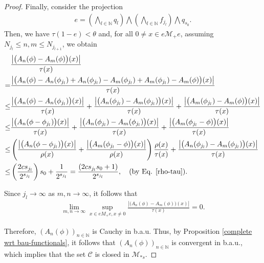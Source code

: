 \documentclass[11pt]{amsart}
\theoremstyle{definition}
\theoremstyle{myremark}
\numberwithin{equation}{section}
\begin{document}
\begin{proof}
		\noindent Finally, consider the projection  
		\begin{align*}
			e= \left( \underset{l \in \mathbb{N}}{\bigwedge} q_l \right) \bigwedge \left( \underset{l \in \mathbb{N}}{\bigwedge} f_{j_l} \right) \bigwedge q_{s_0}.
		\end{align*}
		Then, we have $\tau(1 - e) < \theta$ and, for all $0 \neq x \in e \mathcal{M}_+ e$, assuming $N_{j_l} \leq n, m \leq N_{j_{l+1}}$, we obtain  
		\begin{align*}
			&\frac{\left| \big(A_n( \phi) - A_m(\phi) \big) (x) \right|}{\tau(x)}\\
			=&  \frac{\left| \big(A_n( \phi) - A_n(\phi_{j_l}) + A_n(\phi_{j_l}) - A_m(\phi_{j_l}) + A_m(\phi_{j_l}) - A_m(\phi) \big) (x) \right|}{\tau(x)}\\
			\leq &  \frac{\left| \big(A_n( \phi) - A_n(\phi_{j_l}) \big)(x)  \right| }{\tau(x) }
			+ \frac{\left| \big(A_n(\phi_{j_l}) - A_m(\phi_{j_l}) \big) (x) \right|}{\tau(x)} 
			+ \frac{\left| \big( A_m(\phi_{j_l}) - A_m(\phi) \big) (x) \right|}{\tau(x)}\\
			\leq &  \frac{\left| \big(A_n( \phi - \phi_{j_l}) \big)(x)  \right| }{\tau(x) }
			+ \frac{\left| \big(A_n(\phi_{j_l}) - A_m(\phi_{j_l}) \big) (x) \right|}{\tau(x)} 
			+ \frac{\left| \big( A_m(\phi_{j_l} - \phi) \big) (x) \right|}{\tau(x)}\\
			\leq &  \left(\frac{\left| \big(A_n( \phi - \phi_{j_l}) \big)(x)  \right| }{\rho(x) } 
			+ \frac{\left| \big( A_m(\phi_{j_l} - \phi) \big) (x) \right|}{\rho(x)} \right) 
			\frac{\rho(x)}{\tau(x)} 
			+ \frac{\left| \big(A_n(\phi_{j_l}) - A_m(\phi_{j_l}) \big) (x) \right|}{\tau(x)}\\
			\leq&  \left(\frac{2cs_{j_{l}}}{2^{s_{j_{l}}}}\right)s_{0} + \frac{1}{2^{s_{j_{l}}}} = \frac{(2cs_{j_{l}}s_{0} +1)} {2^{s_{j_{l}}}}, 
			\quad (\text{by Eq. } \ref{rho-tau}). 
		\end{align*}	
		
		\noindent Since $j_l \to \infty$ as $m,n \to \infty$, it follows that  
		\begin{align*}
			\lim_{m,n \to \infty} \sup_{x \in e M_+ e, x \neq 0} \frac{\left| \big(A_n( \phi) - A_m(\phi) \big) (x) \right|}{\tau(x)} = 0.
		\end{align*}
		
		\noindent Therefore, $(A_n(\phi))_{n \in \mathbb{N}}$ is Cauchy in b.a.u. Thus, by Proposition \ref{complete wrt bau-functionals}, it follows that $(A_n(\phi))_{n \in \mathbb{N}}$ is convergent in b.a.u., which implies that the set $\mathcal{C}$ is closed in $\mathcal{M}_{*s}$.		
	\end{proof}
\end{document}
